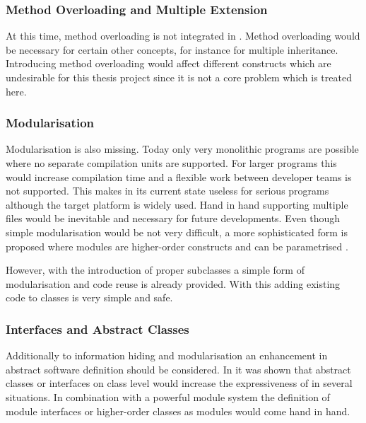 \subsubsection{Method Overloading and Multiple Extension}
At this time, method overloading is not integrated in \ooplss. Method
overloading would be necessary for certain other concepts, for instance
for multiple inheritance. Introducing method overloading would affect
different constructs which are undesirable for this thesis project since
it is not a core problem which is treated here.


\subsubsection{Modularisation}
Modularisation is also missing. Today only very monolithic programs
are possible where no separate compilation units are supported. For larger
programs this would increase compilation time and a flexible work between
developer teams is not supported. This makes \ooplss in its current state
useless for serious programs although the target platform is widely
used. Hand in hand supporting multiple files would be inevitable and
necessary for future developments. Even though simple modularisation would be
not very difficult, a more sophisticated form is proposed where modules are
higher-order constructs and can be parametrised \cite{dreyer_type_2003}.

However, with the introduction of proper subclasses a simple form of
modularisation and code reuse is already provided. With this adding
existing code to classes is very simple and safe.

\subsubsection{Interfaces and Abstract Classes}
Additionally to information hiding and modularisation an
enhancement in abstract software definition should be considered. In
 it was shown that abstract classes or
interfaces on class level would increase the expressiveness of \ooplss
in several situations. In combination with a powerful module system
the definition of module interfaces or higher-order classes as modules
would come hand in hand.

